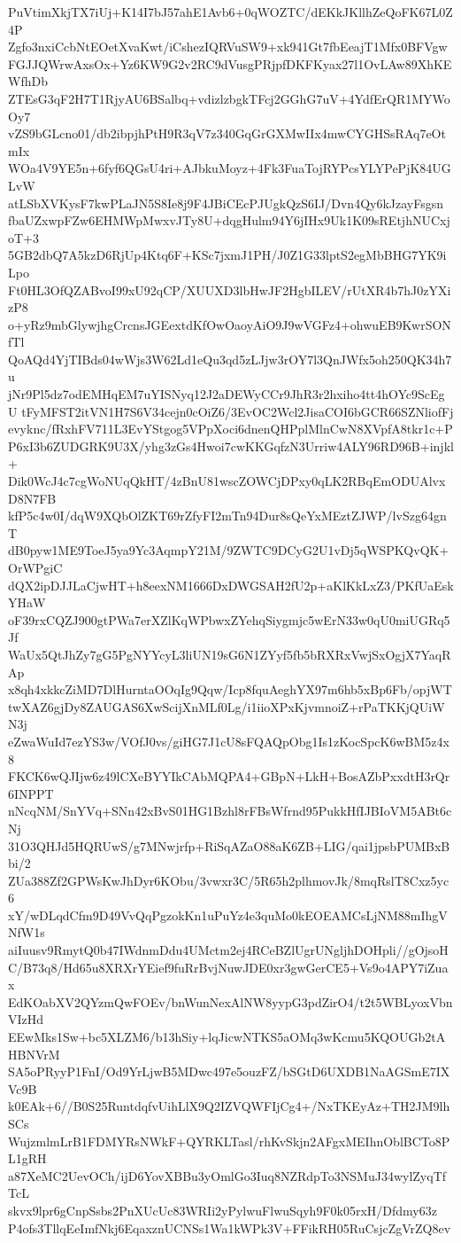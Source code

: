 PuVtimXkjTX7iUj+K14I7bJ57ahE1Avb6+0qWOZTC/dEKkJKllhZeQoFK67L0Z4P
Zgfo3nxiCcbNtEOetXvaKwt/iCshezIQRVuSW9+xk941Gt7fbEeajT1Mfx0BFVgw
FGJJQWrwAxsOx+Yz6KW9G2v2RC9dVusgPRjpfDKFKyax27l1OvLAw89XhKEWfhDb
ZTEsG3qF2H7T1RjyAU6BSalbq+vdizlzbgkTFcj2GGhG7uV+4YdfErQR1MYWoOy7
vZS9bGLcno01/db2ibpjhPtH9R3qV7z340GqGrGXMwIIx4mwCYGHSsRAq7eOtmIx
WOa4V9YE5n+6fyf6QGsU4ri+AJbkuMoyz+4Fk3FuaTojRYPcsYLYPePjK84UGLvW
atLSbXVKysF7kwPLaJN5S8Ie8j9F4JBiCEcPJUgkQzS6IJ/Dvn4Qy6kJzayFsgsn
fbaUZxwpFZw6EHMWpMwxvJTy8U+dqgHulm94Y6jIHx9Uk1K09sREtjhNUCxjoT+3
5GB2dbQ7A5kzD6RjUp4Ktq6F+KSc7jxmJ1PH/J0Z1G33lptS2egMbBHG7YK9iLpo
Ft0HL3OfQZABvoI99xU92qCP/XUUXD3lbHwJF2HgbILEV/rUtXR4b7hJ0zYXizP8
o+yRz9mbGlywjhgCrcnsJGEextdKfOwOaoyAiO9J9wVGFz4+ohwuEB9KwrSONfTl
QoAQd4YjTIBds04wWjs3W62Ld1eQu3qd5zLJjw3rOY7l3QnJWfx5oh250QK34h7u
jNr9Pl5dz7odEMHqEM7uYISNyq12J2aDEWyCCr9JhR3r2hxiho4tt4hOYc9ScEgU
tFyMFST2itVN1H7S6V34cejn0cOiZ6/3EvOC2Wcl2JisaCOI6bGCR66SZNliofFj
evyknc/fRxhFV711L3EvYStgog5VPpXoci6dnenQHPplMlnCwN8XVpfA8tkr1c+P
P6xI3b6ZUDGRK9U3X/yhg3zGs4Hwoi7cwKKGqfzN3Urriw4ALY96RD96B+injkl+
Dik0WcJ4c7cgWoNUqQkHT/4zBnU81wscZOWCjDPxy0qLK2RBqEmODUAlvxD8N7FB
kfP5c4w0I/dqW9XQbOlZKT69rZfyFI2mTn94Dur8sQeYxMEztZJWP/lvSzg64gnT
dB0pyw1ME9ToeJ5ya9Yc3AqmpY21M/9ZWTC9DCyG2U1vDj5qWSPKQvQK+OrWPgiC
dQX2ipDJJLaCjwHT+h8eexNM1666DxDWGSAH2fU2p+aKlKkLxZ3/PKfUaEskYHaW
oF39rxCQZJ900gtPWa7erXZlKqWPbwxZYehqSiygmjc5wErN33w0qU0miUGRq5Jf
WaUx5QtJhZy7gG5PgNYYcyL3liUN19sG6N1ZYyf5fb5bRXRxVwjSxOgjX7YaqRAp
x8qh4xkkcZiMD7DlHurntaOOqIg9Qqw/Icp8fquAeghYX97m6hb5xBp6Fb/opjWT
twXAZ6gjDy8ZAUGAS6XwScijXnMLf0Lg/i1iioXPxKjvmnoiZ+rPaTKKjQUiWN3j
eZwaWuId7ezYS3w/VOfJ0vs/giHG7J1cU8sFQAQpObg1Is1zKocSpcK6wBM5z4x8
FKCK6wQJIjw6z49lCXeBYYIkCAbMQPA4+GBpN+LkH+BosAZbPxxdtH3rQr6INPPT
nNcqNM/SnYVq+SNn42xBvS01HG1Bzhl8rFBsWfrnd95PukkHfIJBIoVM5ABt6cNj
31O3QHJd5HQRUwS/g7MNwjrfp+RiSqAZaO88aK6ZB+LIG/qai1jpsbPUMBxBbi/2
ZUa388Zf2GPWsKwJhDyr6KObu/3vwxr3C/5R65h2plhmovJk/8mqRslT8Cxz5yc6
xY/wDLqdCfm9D49VvQqPgzokKn1uPuYz4e3quMo0kEOEAMCsLjNM88mIhgVNfW1s
aiIuusv9RmytQ0b47IWdnmDdu4UMctm2ej4RCeBZlUgrUNgljhDOHpli//gOjsoH
C/B73q8/Hd65u8XRXrYEief9fuRrBvjNuwJDE0xr3gwGerCE5+Vs9o4APY7iZuax
EdKOabXV2QYzmQwFOEv/bnWunNexAlNW8yypG3pdZirO4/t2t5WBLyoxVbnVIzHd
EEwMks1Sw+bc5XLZM6/b13hSiy+lqJicwNTKS5aOMq3wKcmu5KQOUGb2tAHBNVrM
SA5oPRyyP1FnI/Od9YrLjwB5MDwc497e5ouzFZ/bSGtD6UXDB1NaAGSmE7IXVc9B
k0EAk+6//B0S25RuntdqfvUihLlX9Q2IZVQWFIjCg4+/NxTKEyAz+TH2JM9lhSCs
WujzmlmLrB1FDMYRsNWkF+QYRKLTasl/rhKvSkjn2AFgxMEIhnOblBCTo8PL1gRH
a87XeMC2UevOCh/ijD6YovXBBu3yOmlGo3Iuq8NZRdpTo3NSMuJ34wylZyqTfTcL
skvx9lpr6gCnpSsbs2PnXUcUc83WRIi2yPylwuFlwuSqyh9F0k05rxH/Dfdmy63z
P4ofs3TllqEeImfNkj6EqaxznUCNSs1Wa1kWPk3V+FFikRH05RuCsjcZgVrZQ8ev
